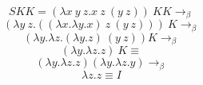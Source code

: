 \documentclass{article}
\begin{document}
\Large$$SKK = (\lambda x\ y\ z.x\ z\ (y\ z))\ K K \rightarrow_\beta$$
$$(\lambda y\ z.((\lambda x. \lambda y. x)\ z\ (y\ z)))\ K \rightarrow_\beta$$
$$(\lambda y.\lambda z.(\lambda y.z)\ (y\ z)) K \rightarrow_\beta$$
$$(\lambda y.\lambda z.z)\ K \equiv$$
$$(\lambda y.\lambda z.z)(\lambda y.\lambda z.y) \rightarrow_\beta$$
$$\lambda z.z \equiv I$$
\end{document}
